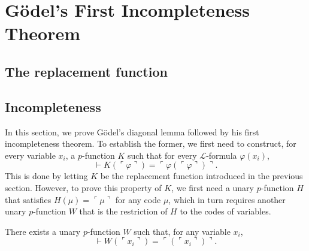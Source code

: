 \chapter{Gödel’s First Incompleteness Theorem}

\section{The replacement function}

\section{Incompleteness}

In this section, we prove Gödel’s diagonal lemma followed by his first incompleteness theorem.
To establish the former, we first need to construct, for every variable $x_i$, 
a $p$-function $K$ such that for every $\mathcal{L}$-formula $\varphi(x_i)$,
$$
\vdash K (\ulcorner{\varphi}\urcorner) = \ulcorner{\varphi(\ulcorner {\varphi} \urcorner)}\urcorner.
$$
This is done by letting $K$ be the replacement function introduced in the previous section.
However, to prove this property of $K$, we first need a unary $p$-function $H$
that satisfies $H(\mu) = \ulcorner {\mu} \urcorner$ for any code $\mu$, which in turn requires
another unary $p$-function $W$ that is the restriction of $H$ to the codes of variables.

\begin{lemma}
    \label{lem:Code.exists_pFunc_forall_var_eq_code}
    There exists a unary $p$-function $W$ such that, for any variable $x_i$,
    $$
    \vdash W(\ulcorner{x_i}\urcorner) = \ulcorner{(\ulcorner{x_i}\urcorner)}\urcorner.
    $$
\end{lemma}

